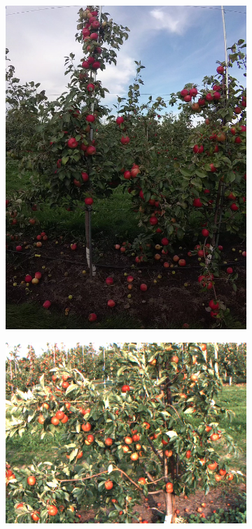 \begin{figure}[!hbpt]
\begin{subfigure}[b]{.22\textwidth}
            \includegraphics[width = \textwidth]{figures/counting/dataset31.jpg}           
       \end{subfigure}\quad \begin{subfigure}[b]{.20\textwidth}
            \includegraphics[width = \textwidth]{figures/counting/dataset4.jpg}           

\end{subfigure}
\end{figure}
